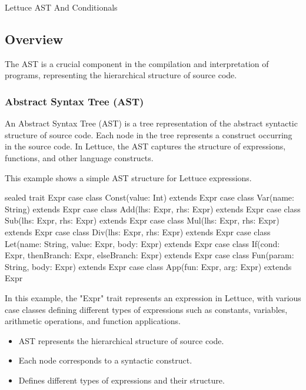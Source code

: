 \begin{notes}{Lettuce AST And Conditionals}
    \subsection*{Overview}

    The AST is a crucial component in the compilation and interpretation of programs, representing the hierarchical structure of source code.
    
    \subsubsection*{Abstract Syntax Tree (AST)}
    
    An Abstract Syntax Tree (AST) is a tree representation of the abstract syntactic structure of source code. Each node in the tree represents a construct occurring in the source code. In Lettuce, 
    the AST captures the structure of expressions, functions, and other language constructs.
    
    \begin{highlight}
    
        This example shows a simple AST structure for Lettuce expressions.
    
    \begin{code}[Scala]
    sealed trait Expr
    case class Const(value: Int) extends Expr
    case class Var(name: String) extends Expr
    case class Add(lhs: Expr, rhs: Expr) extends Expr
    case class Sub(lhs: Expr, rhs: Expr) extends Expr
    case class Mul(lhs: Expr, rhs: Expr) extends Expr
    case class Div(lhs: Expr, rhs: Expr) extends Expr
    case class Let(name: String, value: Expr, body: Expr) extends Expr
    case class If(cond: Expr, thenBranch: Expr, elseBranch: Expr) extends Expr
    case class Fun(param: String, body: Expr) extends Expr
    case class App(fun: Expr, arg: Expr) extends Expr
    \end{code}
    
        In this example, the "Expr" trait represents an expression in Lettuce, with various case classes defining different types of expressions such as constants, variables, arithmetic operations, 
        and function applications.
    
        \begin{itemize}
            \item AST represents the hierarchical structure of source code.
            \item Each node corresponds to a syntactic construct.
            \item Defines different types of expressions and their structure.
        \end{itemize}
    

\end{highlight}
\end{notes}
